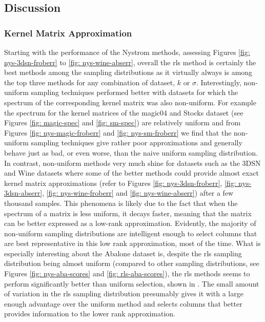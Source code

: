 \subsection{Discussion}\label{Section5.3}

\subsubsection{Kernel Matrix Approximation}\label{Section5.3.1}

Starting with the performance of the Nystrom methods, assessing Figures \ref{fig: nys-3dsn-froberr} to \ref{fig: nys-wine-abserr}, overall the rls method is certainly the best methods among the sampling distributions as it virtually always is among the top three methods for any combination of dataset, $k$ or $\sigma$. Interestingly, non-uniform sampling techniques performed better with datasets for which the spectrum of the corresponding kernel matrix was also non-uniform. For example the spectrum for the kernel matrices of the magic04 and Stocks dataset (see Figures \ref{fig: magic-spec} and \ref{fig: sm-spec}) are relatively uniform and from Figures \ref{fig: nys-magic-froberr} and \ref{fig: nys-sm-froberr} we find that the non-uniform sampling techniques give rather poor approximations and generally behave just as bad, or even worse, than the naive uniform sampling distribution. In contrast, non-uniform methods very much shine for datasets such as the 3DSN and Wine datasets where some of the better methods could provide almost exact kernel matrix approximations (refer to Figures \ref{fig: nys-3dsn-froberr}, \ref{fig: nys-3dsn-abserr}, \ref{fig: nys-wine-froberr} and \ref{fig: nys-wine-abserr}) after a few thousand samples. This phenomena is likely due to the fact that when the spectrum of a matrix is less uniform, it decays faster, meaning that the matrix can be better expressed as a low-rank approximation. Evidently, the majority of non-uniform sampling distributions are intelligent enough to select columns that are best representative in this low rank approximation, most of the time. What is especially interesting about the Abalone dataset is, despite the rls sampling distribution being almost uniform (compared to other sampling distributions, see Figures \ref{fig: nys-aba-scores} and \ref{fig: rls-aba-scores}), the rls methods seems to perform significantly better than uniform selection, shown in . The small amount of variation in the rls sampling distribution presumably gives it with a large enough advantage over the uniform method and selects columns that better provides information to the lower rank approximation.

